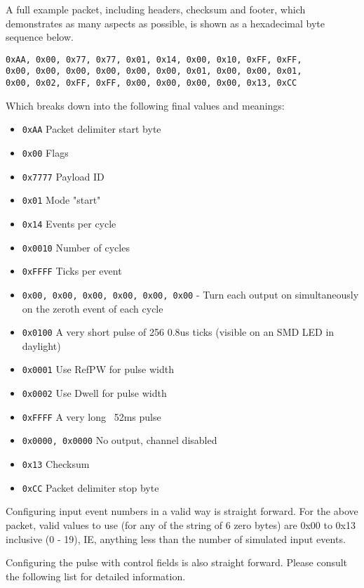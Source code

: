 \documentclass[12pt,a4paper,titlepage]{article}
\begin{document}
A full example packet, including headers, checksum and footer, which demonstrates as many aspects as possible, is shown as a hexadecimal byte sequence below.

\texttt{0xAA, 0x00, 0x77, 0x77, 0x01, 0x14, 0x00, 0x10, 0xFF, 0xFF,\\
 0x00, 0x00, 0x00, 0x00, 0x00, 0x00, 0x01, 0x00, 0x00, 0x01,\\
 0x00, 0x02, 0xFF, 0xFF, 0x00, 0x00, 0x00, 0x00, 0x13, 0xCC}

Which breaks down into the following final values and meanings:

\begin{itemize}
\item \texttt{0xAA} Packet delimiter start byte
\item \texttt{0x00} Flags
\item \texttt{0x7777} Payload ID
\item \texttt{0x01} Mode "start"
\item \texttt{0x14} Events per cycle
\item \texttt{0x0010} Number of cycles
\item \texttt{0xFFFF} Ticks per event
\item \texttt{0x00, 0x00, 0x00, 0x00, 0x00, 0x00} - Turn each output on simultaneously on the zeroth event of each cycle
\item \texttt{0x0100} A very short pulse of 256 0.8us ticks (visible on an SMD LED in daylight)
\item \texttt{0x0001} Use RefPW for pulse width
\item \texttt{0x0002} Use Dwell for pulse width
\item \texttt{0xFFFF} A very long ~52ms pulse
\item \texttt{0x0000, 0x0000} No output, channel disabled
\item \texttt{0x13} Checksum
\item \texttt{0xCC} Packet delimiter stop byte
\end{itemize}

Configuring input event numbers in a valid way is straight forward. For the above packet, valid values to use (for any of the string of 6 zero bytes) are 0x00 to 0x13 inclusive (0 - 19), IE, anything less than the number of simulated input events.

Configuring the pulse with control fields is also straight forward. Please consult the following list for detailed information.
\end{document}
